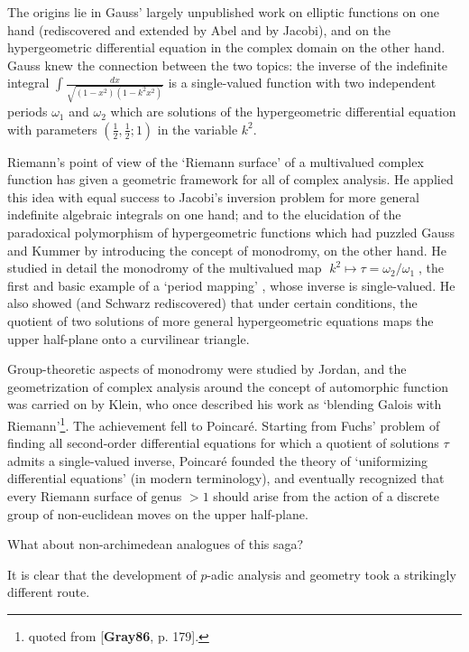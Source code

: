 The origins lie in Gauss' largely unpublished work on elliptic
functions on one hand (rediscovered and extended by Abel and by Jacobi),
and on the hypergeometric differential equation in the complex domain on
the other hand. Gauss knew the connection between the two topics: the
inverse of the indefinite integral
$\int\frac{dx}{\sqrt{(1-x^2)(1-k^2x^2)}}$ is a single-valued function
with two independent periods $\omega_1$ and $\omega_2$ which are
solutions of the 
hypergeometric differential equation with parameters
$(\frac{1}{2},\frac{1}{2};1)$ in the variable $k^2$.

Riemann's point of view of the `Riemann surface' of a multivalued
complex function has given a geometric framework for all of complex
analysis. He applied this idea with equal success to Jacobi's inversion
problem for more general indefinite algebraic integrals on one hand; and
to the elucidation of the paradoxical polymorphism of hypergeometric
functions which had puzzled Gauss and Kummer by introducing the concept
of monodromy, on the other hand. He studied in detail the monodromy of
the multivalued map $ \; k^2\mapsto \tau ={\omega_2/\omega_1}\;$, the
first and basic example of a `period mapping' , whose inverse is
single-valued. He also showed (and Schwarz rediscovered) that under
certain conditions, the quotient of two solutions of more general
hypergeometric equations maps the upper half-plane onto a curvilinear
triangle.

 Group-theoretic aspects of monodromy were studied by Jordan, and the
 geometrization of complex analysis around the concept of automorphic
 function was carried on by Klein, who once described his work as
 `blending Galois with Riemann'\footnote{quoted from [{\bf Gray86},
 p. 179].}.  The achievement fell to Poincar\'e. Starting from Fuchs'
 problem of finding all second-order differential equations for which a
 quotient of solutions $\tau$ admits a single-valued inverse, Poincar\'e
 founded the theory of `uniformizing differential equations' (in modern
 terminology), and eventually recognized that every Riemann surface of
 genus $>1$ should arise from the action of a discrete group of
 non-euclidean moves on the upper half-plane.

\bigskip
\bigskip

 What about non-archimedean analogues of this saga?

\bigskip

It is clear that the development of $p$-adic analysis and geometry took
a strikingly different route.


